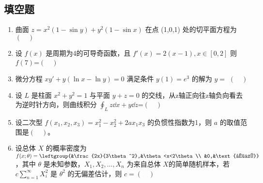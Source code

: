 \subsection{填空题}
\begin{enumerate}
\item 曲面 $z=x^2(1-\sin y)+y^2(1-\sin x)$  在点 (1,0,1) 处的切平面方程为$(\quad)$
\item 设 $f(x)$ 是周期为4的可导奇函数，且 $f'(x)=2(x-1),x \in [0,2]$  则 $f(7)$=$(\quad)$
\item 微分方程 $xy'+y(\ln x-\ln y)=0$ 满足条件 $y(1)=e^3$ 的解为 $y=$ $(\quad)$
\item 设 $L$ 是柱面 $x^2+y^2=1$ 与平面 $y+z=0$ 的交线，从z轴正向往z轴负向看去为逆时针方向，则曲线积分 $\displaystyle \oint_L z\dd{x}+y\dd{z}$=$(\quad)$
\item 设二次型 $f(x_1,x_2,x_3)=x_1^2-x_2^2+2ax_1x_3$  的负惯性指数为1，则 $a$ 的取值范围是$(\quad)$。
\item 设总体 $X$ 的概率密度为$f(x;\theta)=\leftgroup{&\frac{2x}{3\theta^2},&\theta<x<2\theta \\ &0,&\text{其他}} $ ，其中 $\theta$  是未知参数，$X_1,X_2,\dots,X_n$  为来自总体 $X$的简单随机样本，若  $\displaystyle c\sum_{n=1}^\infty X_i^2$ 是 $\theta^2$ 的无偏差估计，则 $c=(\quad)$
\end{enumerate}
